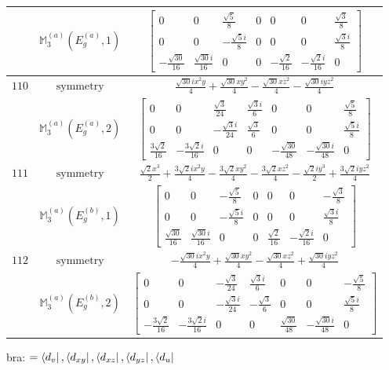 \documentclass[fleqn,8pt,landscape]{jsarticle}
\begin{document}
\begin{longtable}{ccc}
$  $ & $ \mathbb{M}_{3}^{(a)}(E_{g}^{(a)},1) $ & $ \begin{bmatrix} 0 & 0 & \frac{\sqrt{5}}{8} & 0 & 0 & 0 & \frac{\sqrt{3}}{8} \\ 0 & 0 & - \frac{\sqrt{5} i}{8} & 0 & 0 & 0 & \frac{\sqrt{3} i}{8} \\ - \frac{\sqrt{30}}{16} & \frac{\sqrt{30} i}{16} & 0 & 0 & - \frac{\sqrt{2}}{16} & - \frac{\sqrt{2} i}{16} & 0 \end{bmatrix} $ \\ \hline
$ 110 $ & $ \text{symmetry} $ & $ \frac{\sqrt{30} i x^{2} y}{4} + \frac{\sqrt{30} x y^{2}}{4} - \frac{\sqrt{30} x z^{2}}{4} - \frac{\sqrt{30} i y z^{2}}{4} $ \\
$  $ & $ \mathbb{M}_{3}^{(a)}(E_{g}^{(a)},2) $ & $ \begin{bmatrix} 0 & 0 & \frac{\sqrt{3}}{24} & \frac{\sqrt{3} i}{6} & 0 & 0 & \frac{\sqrt{5}}{8} \\ 0 & 0 & - \frac{\sqrt{3} i}{24} & \frac{\sqrt{3}}{6} & 0 & 0 & \frac{\sqrt{5} i}{8} \\ \frac{3 \sqrt{2}}{16} & - \frac{3 \sqrt{2} i}{16} & 0 & 0 & - \frac{\sqrt{30}}{48} & - \frac{\sqrt{30} i}{48} & 0 \end{bmatrix} $ \\ \hline
$ 111 $ & $ \text{symmetry} $ & $ \frac{\sqrt{2} x^{3}}{2} + \frac{3 \sqrt{2} i x^{2} y}{4} - \frac{3 \sqrt{2} x y^{2}}{4} - \frac{3 \sqrt{2} x z^{2}}{4} - \frac{\sqrt{2} i y^{3}}{2} + \frac{3 \sqrt{2} i y z^{2}}{4} $ \\
$  $ & $ \mathbb{M}_{3}^{(a)}(E_{g}^{(b)},1) $ & $ \begin{bmatrix} 0 & 0 & - \frac{\sqrt{5}}{8} & 0 & 0 & 0 & - \frac{\sqrt{3}}{8} \\ 0 & 0 & - \frac{\sqrt{5} i}{8} & 0 & 0 & 0 & \frac{\sqrt{3} i}{8} \\ \frac{\sqrt{30}}{16} & \frac{\sqrt{30} i}{16} & 0 & 0 & \frac{\sqrt{2}}{16} & - \frac{\sqrt{2} i}{16} & 0 \end{bmatrix} $ \\ \hline
$ 112 $ & $ \text{symmetry} $ & $ - \frac{\sqrt{30} i x^{2} y}{4} + \frac{\sqrt{30} x y^{2}}{4} - \frac{\sqrt{30} x z^{2}}{4} + \frac{\sqrt{30} i y z^{2}}{4} $ \\
$  $ & $ \mathbb{M}_{3}^{(a)}(E_{g}^{(b)},2) $ & $ \begin{bmatrix} 0 & 0 & - \frac{\sqrt{3}}{24} & \frac{\sqrt{3} i}{6} & 0 & 0 & - \frac{\sqrt{5}}{8} \\ 0 & 0 & - \frac{\sqrt{3} i}{24} & - \frac{\sqrt{3}}{6} & 0 & 0 & \frac{\sqrt{5} i}{8} \\ - \frac{3 \sqrt{2}}{16} & - \frac{3 \sqrt{2} i}{16} & 0 & 0 & \frac{\sqrt{30}}{48} & - \frac{\sqrt{30} i}{48} & 0 \end{bmatrix} $ \\ \hline
\end{longtable}
bra: $=\bra{d_{v}}, \bra{d_{xy}}, \bra{d_{xz}}, \bra{d_{yz}}, \bra{d_{u}}$
\end{document}
